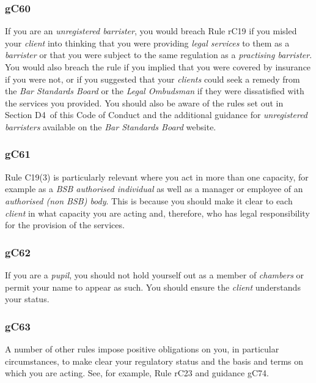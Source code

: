 \subsubsection{\color{darkgrey}gC60}

If you are an \emph{unregistered barrister}, you would breach Rule rC19
if you misled your \emph{client} into thinking that you were providing
\emph{legal services} to them as a \emph{barrister} or that you were
subject to the same regulation as a \emph{practising barrister}. You
would also breach the rule if you implied that you were covered by
insurance if you were not, or if you suggested that your \emph{clients}
could seek a remedy from the \emph{Bar Standards Board} or the
\emph{Legal Ombudsman} if they were dissatisfied with the services you
provided. You should also be aware of the rules set out in Section D4~of
this Code of Conduct and the additional guidance for \emph{unregistered
barristers} available on the \emph{Bar Standards Board} website.

\subsubsection{\color{darkgrey}gC61}

Rule C19(3) is particularly relevant where you act in more than one
capacity, for example as a \emph{BSB authorised individual} as well as a
manager or employee of an \emph{authorised (non BSB) body}. This is
because you should make it clear to each \emph{client} in what capacity
you are acting and, therefore, who has legal responsibility for the
provision of the services.

\subsubsection{\color{darkgrey}gC62}

If you are a \emph{pupil}, you should not hold yourself out as a member
of \emph{chambers} or permit your name to appear as such. You should
ensure the \emph{client} understands your status.

\subsubsection{\color{darkgrey}gC63}

A number of other rules impose positive obligations on you, in
particular circumstances, to make clear your regulatory status and the
basis and terms on which you are acting. See, for example, Rule rC23 and
guidance gC74.

